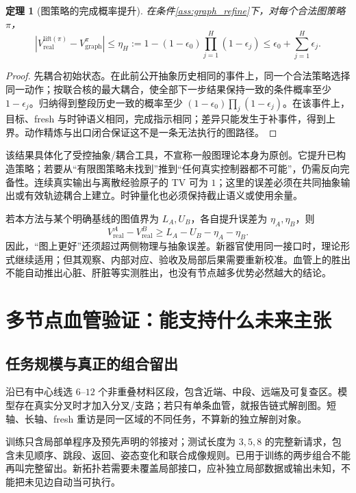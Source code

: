 \documentclass[11pt,a4paper,fontset=fandol]{ctexart}
\newtheorem{theorem}{定理}[section]
\theoremstyle{definition}
\theoremstyle{remark}\newtheorem{remark}[theorem]{说明}
\numberwithin{equation}{section}
\begin{document}
\begin{theorem}[图策略的完成概率提升]
\label{thm:graph_lift}
在条件\ref{ass:graph_refine}下，对每个合法图策略 $\pi$，
\begin{equation}
 \left|V_{\mathrm{real}}^{\mathrm{lift}(\pi)}
 -V_{\mathrm{graph}}^\pi\right|
 \le
 \eta_H
 :=1-(1-\epsilon_0)\prod_{j=1}^{H}(1-\epsilon_j)
 \le\epsilon_0+\sum_{j=1}^{H}\epsilon_j .
 \label{eq:graph_lift}
\end{equation}
\end{theorem}
\begin{proof}
先耦合初始状态。在此前公开抽象历史相同的事件上，同一个合法策略选择同一动作；按联合核的最大耦合，使全部下一步结果保持一致的条件概率至少 $1-\epsilon_j$。归纳得到整段历史一致的概率至少 $(1-\epsilon_0)\prod_j(1-\epsilon_j)$。在该事件上，目标、fresh 与时钟语义相同，完成指示相同；差异只能发生于补事件，得到上界。动作精炼与出口闭合保证这不是一条无法执行的图路径。
\end{proof}

该结果具体化了受控抽象/耦合工具，不宣称一般图理论本身为原创。它提升已构造策略；若要从“有限图策略未找到”推到“任何真实控制器都不可能”，仍需反向完备性。连续真实输出与离散经验原子的 TV 可为 $1$；这里的误差必须在共同抽象输出或有效轨迹耦合上建立。时钟量化也必须保持截止语义或使用余量。

若本方法与某个明确基线的图值界为 $L_A,U_B$，各自提升误差为 $\eta_A,\eta_B$，则
\begin{equation}
 V_{\mathrm{real}}^A-V_{\mathrm{real}}^B
 \ge L_A-U_B-\eta_A-\eta_B.
\end{equation}
因此，“图上更好”还须超过两侧物理与抽象误差。新器官使用同一接口时，理论形式继续适用；但其观察、内部对应、验收及局部后果需要重新校准。血管上的胜出不能自动推出心脏、肝脏等实测胜出，也没有节点越多优势必然越大的结论。

\section{多节点血管验证：能支持什么未来主张}
\label{sec:graph_protocol}
\subsection{任务规模与真正的组合留出}
沿已有中心线选 $6$--$12$ 个非重叠材料区段，包含近端、中段、远端及可复查区。模型存在真实分叉时才加入分叉/支路；若只有单条血管，就报告链式解剖图。短轴、长轴、fresh 重访是同一区域的不同任务，不算新的独立解剖对象。

训练只含局部单程序及预先声明的邻接对；测试长度为 $3,5,8$ 的完整新请求，包含未见顺序、跳段、返回、姿态变化和联合成像规则。已用于训练的两步组合不能再叫完整留出。新拓扑若需要未覆盖局部接口，应补独立局部数据或输出未知，不能把未见边自动当可执行。
\end{document}
